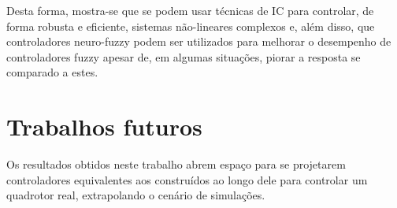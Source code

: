 

Desta forma, mostra-se que se podem usar técnicas de IC para controlar, de forma robusta e eficiente, sistemas não-lineares complexos e, além disso, que controladores neuro-fuzzy podem ser utilizados para melhorar o desempenho de controladores fuzzy apesar de, em algumas situações, piorar a resposta se comparado a estes.

\section{Trabalhos futuros}
\label{sec:conclusao-trabalhosFuturos}

Os resultados obtidos neste trabalho abrem espaço para  se projetarem controladores equivalentes aos construídos ao longo dele para controlar um quadrotor real, extrapolando o cenário de simulações.


